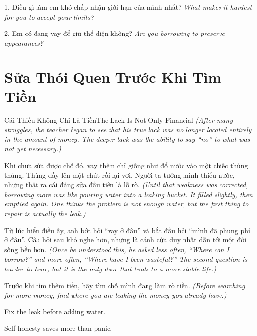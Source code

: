 \begin{tuhocnhanh}
1. Điều gì làm em khó chấp nhận giới hạn của mình nhất? \textit{What makes it hardest for you to accept your limits?}

2. Em có đang vay để giữ thể diện không? \textit{Are you borrowing to preserve appearances?}
\end{tuhocnhanh}
\ngancach

\section{Sửa Thói Quen Trước Khi Tìm Tiền}
\begin{truyen}{Cái Thiếu Không Chỉ Là Tiền}{The Lack Is Not Only Financial}
\textit{(After many struggles, the teacher began to see that his true lack was no longer located entirely in the amount of money. The deeper lack was the ability to say ``no'' to what was not yet necessary.)}

Khi chưa sửa được chỗ đó, vay thêm chỉ giống như đổ nước vào một chiếc thùng thủng. Thùng đầy lên một chút rồi lại vơi. Người ta tưởng mình thiếu nước, nhưng thật ra cái đáng sửa đầu tiên là lỗ rò.
\textit{(Until that weakness was corrected, borrowing more was like pouring water into a leaking bucket. It filled slightly, then emptied again. One thinks the problem is not enough water, but the first thing to repair is actually the leak.)}

Từ lúc hiểu điều ấy, anh bớt hỏi ``vay ở đâu'' và bắt đầu hỏi ``mình đã phung phí ở đâu''. Câu hỏi sau khó nghe hơn, nhưng là cánh cửa duy nhất dẫn tới một đời sống bền hơn.
\textit{(Once he understood this, he asked less often, ``Where can I borrow?'' and more often, ``Where have I been wasteful?'' The second question is harder to hear, but it is the only door that leads to a more stable life.)}
\end{truyen}

\begin{baihoc}
Trước khi tìm thêm tiền, hãy tìm chỗ mình đang làm rò tiền.
\textit{(Before searching for more money, find where you are leaking the money you already have.)}
\end{baihoc}

\begin{ghinhoanh}
Fix the leak before adding water.

Self-honesty saves more than panic.
\end{ghinhoanh}

